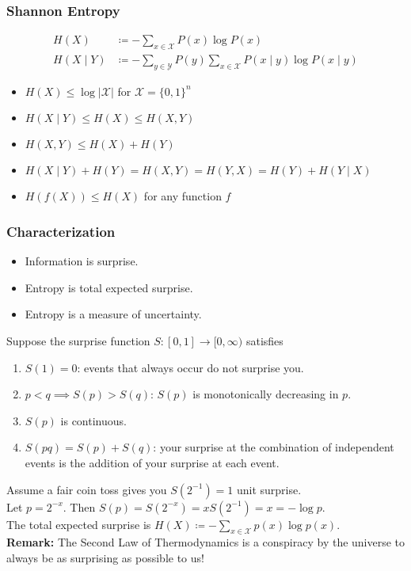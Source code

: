 \documentclass[UTF8,11pt,colorlinks,compress,openany]{beamer}%
\begin{document}
\begin{frame}\frametitle{Shannon Entropy}
\begin{definition}
\begin{align*}
	H(X)&\coloneqq -\sum\limits_{x\in\mathcal{X}} P(x)\log P(x)\\
	H(X\mid Y)&\coloneqq -\sum\limits_{y\in\mathcal{Y}} P(y)\sum\limits_{x\in\mathcal{X}} P(x\mid y)\log P(x\mid y)
\end{align*}
\end{definition}
\begin{itemize}
	\item $H(X)\leq \log|\mathcal{X}|$ for $\mathcal{X}=\{0,1\}^n$
	\item $H(X\mid Y)\leq H(X)\leq H(X,Y)$
	\item $H(X,Y)\leq H(X)+H(Y)$
	\item $H(X\mid Y)+H(Y)=H(X,Y)=H(Y,X)=H(Y)+H(Y\mid X)$
	\item $H(f(X))\leq H(X)$ for any function $f$
\end{itemize}
\end{frame}

\begin{frame}\frametitle{Characterization}
\begin{itemize}
	\item Information is surprise.
	\item Entropy is total expected surprise.
	\item Entropy is a measure of uncertainty.
\end{itemize}
Suppose the surprise function $S:[0,1]\to[0,\infty)$ satisfies
\begin{enumerate}
	\item $S(1)=0$: events that always occur do not surprise you.
	\item $p < q\implies S(p)>S(q)$: $S(p)$ is monotonically decreasing in $p$.
	\item $S(p)$ is continuous.
	\item $S(pq) = S(p) + S(q)$: your surprise at the combination of independent events is the addition of your surprise at each event.
\end{enumerate}
Assume a fair coin toss gives you $S(2^{-1})=1$ unit surprise.\\
Let $p=2^{-x}$. Then $S(p)=S(2^{-x})=xS(2^{-1})=x=-\log p$.\\
The total expected surprise is $H(X)\coloneqq -\sum\limits_{x\in\mathcal{X}} p(x)\log p(x)$.\\
\textbf{Remark:} The Second Law of Thermodynamics is a conspiracy by the universe to always be as surprising as possible to us!
\end{frame}
\end{document}
